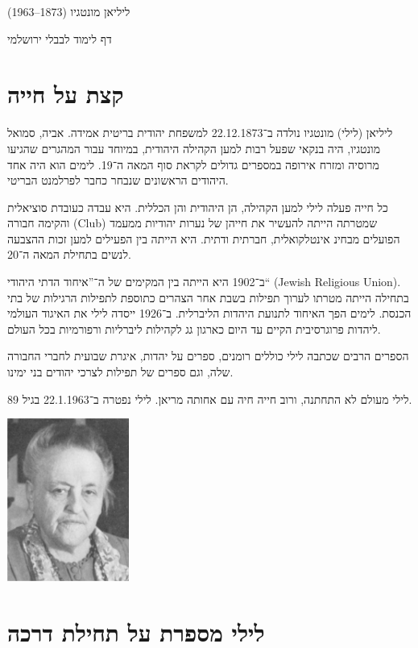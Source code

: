 \documentclass[14pt, article, extrafontsizes, twopage, a4paper]{memoir}
\begin{document}
{
  \centering
  \LARGE ליליאן מונטגיו (1873–1963)

  \Large דף לימוד לבבלי ירושלמי

}

\chapter{קצת על חייה}

ליליאן (לילי) מונטגיו נולדה ב־22.12.1873 למשפחת יהודית בריטית אמידה. אביה, סמואל מונטגיו, היה בנקאי שפעל רבות למען הקהילה היהודית, במיוחד עבור המהגרים שהגיעו מרוסיה ומזרח אירופה במספרים גדולים לקראת סוף המאה ה־19. לימים הוא היה אחד היהודים הראשונים שנבחר כחבר לפרלמנט הבריטי.

כל חייה פעלה לילי למען הקהילה, הן היהודית והן הכללית. היא עבדה כעובדת סוציאלית והקימה חבורה (\textenglish{Club}) שמטרתה הייתה להעשיר את חייהן של נערות יהודיות ממעמד הפועלים מבחינ אינטלקואלית, חברתית ודתית. היא הייתה בין הפעילים למען זכות ההצבעה לנשים בתחילת המאה ה־20.

ב־1902 היא הייתה בין המקימים של ה־”איחוד הדתי היהודי“ (\textenglish{Jewish Religious Union}). בתחילה הייתה מטרתו לערוך תפילות בשבת אחר הצהרים  כתוספת לתפילות הרגילות של בתי הכנסת. לימים הפך האיחוד לתנועת היהדות הליברלית. ב־1926 ייסדה לילי את האיגוד העולמי ליהדות פרוגרסיבית הקיים עד היום כארגון גג לקהילות ליברליות ורפורמיות בכל העולם.

הספרים הרבים שכתבה לילי כוללים רומנים, ספרים על יהדות, איגרת שבועית לחברי החבורה שלה, וגם ספרים של תפילות לצרכי יהודים בני ימינו.

לילי מעולם לא התחתנה, ורוב חייה חיה עם אחותה מריאן. לילי נפטרה ב־22.1.1963 בגיל 89.

{
  \centering
\includegraphics[width=4cm]{lilyolder.png}\\

}


\chapter{לילי מספרת על תחילת דרכה}
\end{document}
